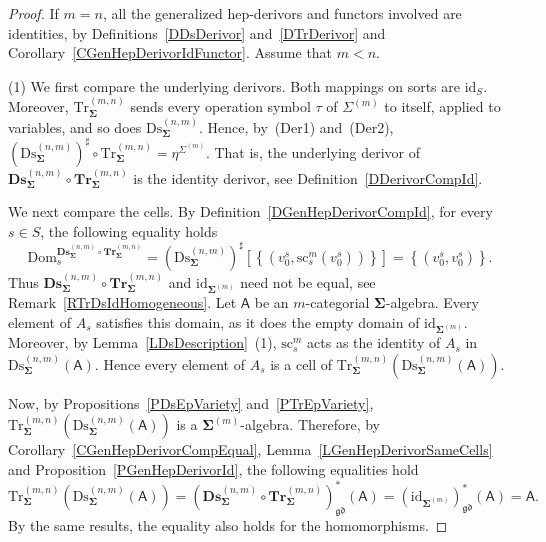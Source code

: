 \documentclass[a4paper, reqno]{amsbook}
\newcommand{\sig}[1]{\mathbf{#1}}             %
\newcommand{\calg}[1]{\boldsymbol{\mathsf{#1}}} %
\newcommand{\Dom}{\mathrm{Dom}}
\newcommand{\gd}{\mathfrak{gd}}              %
\newcommand{\id}{\mathrm{id}}
\newcommand{\src}{\mathrm{sc}}
\newcommand{\Ds}{\mathrm{Ds}}
\newcommand{\Tr}{\mathrm{Tr}}
\newcommand{\bDs}{\mathbf{Ds}}
\newcommand{\bTr}{\mathbf{Tr}}
\theoremstyle{plain}
\theoremstyle{definition}
\begin{document}
\begin{proof}
If $m=n$, all the generalized hep-derivors and functors involved are identities, by Definitions~\ref{DDsDerivor} and~\ref{DTrDerivor} and Corollary~\ref{CGenHepDerivorIdFunctor}.
Assume that $m<n$.

(1) We first compare the underlying derivors.
Both mappings on sorts are $\id_{S}$.
Moreover, $\Tr^{(m,n)}_{\sig{\Sigma}}$ sends every operation symbol $\tau$ of $\Sigma^{(m)}$ to itself, applied to variables, and so does $\Ds^{(n,m)}_{\sig{\Sigma}}$.
Hence, by~(Der1) and~(Der2), $(\Ds^{(n,m)}_{\sig{\Sigma}})^{\sharp}\circ\Tr^{(m,n)}_{\sig{\Sigma}}=\eta^{\Sigma^{(m)}}$.
That is, the underlying derivor of $\bDs^{(n,m)}_{\sig{\Sigma}}\circ\bTr^{(m,n)}_{\sig{\Sigma}}$ is the identity derivor, see Definition~\ref{DDerivorCompId}.

We next compare the cells.
By Definition~\ref{DGenHepDerivorCompId}, for every $s\in S$, the following equality holds
$$
\Dom^{\bDs^{(n,m)}_{\sig{\Sigma}}\circ\bTr^{(m,n)}_{\sig{\Sigma}}}_{s}=\left(\Ds^{(n,m)}_{\sig{\Sigma}}\right)^{\sharp}\left[\left\lbrace\left(v^{s}_{0},\src^{m}_{s}(v^{s}_{0})\right)\right\rbrace\right]=\left\lbrace\left(v^{s}_{0},v^{s}_{0}\right)\right\rbrace.
$$
Thus $\bDs^{(n,m)}_{\sig{\Sigma}}\circ\bTr^{(m,n)}_{\sig{\Sigma}}$ and $\id_{\sig{\Sigma}^{(m)}}$ need not be equal, see Remark~\ref{RTrDsIdHomogeneous}.
Let $\calg{A}$ be an $m$-categorial $\sig{\Sigma}$-algebra.
Every element of $A_{s}$ satisfies this domain, as it does the empty domain of $\id_{\sig{\Sigma}^{(m)}}$.
Moreover, by Lemma~\ref{LDsDescription}~(1), $\src^{m}_{s}$ acts as the identity of $A_{s}$ in $\Ds^{(n,m)}_{\sig{\Sigma}}(\calg{A})$.
Hence every element of $A_{s}$ is a cell of $\Tr^{(m,n)}_{\sig{\Sigma}}(\Ds^{(n,m)}_{\sig{\Sigma}}(\calg{A}))$.

Now, by Propositions~\ref{PDsEpVariety} and~\ref{PTrEpVariety}, $\Tr^{(m,n)}_{\sig{\Sigma}}(\Ds^{(n,m)}_{\sig{\Sigma}}(\calg{A}))$ is a $\sig{\Sigma}^{(m)}$-algebra.
Therefore, by Corollary~\ref{CGenHepDerivorCompEqual}, Lemma~\ref{LGenHepDerivorSameCells} and Proposition~\ref{PGenHepDerivorId}, the following equalities hold
$$
\Tr^{(m,n)}_{\sig{\Sigma}}\left(\Ds^{(n,m)}_{\sig{\Sigma}}(\calg{A})\right)
=
\left(\bDs^{(n,m)}_{\sig{\Sigma}}\circ\bTr^{(m,n)}_{\sig{\Sigma}}\right)^{\ast}_{\gd}(\calg{A})
=
\left(\id_{\sig{\Sigma}^{(m)}}\right)^{\ast}_{\gd}(\calg{A})
=
\calg{A}.
$$
By the same results, the equality also holds for the homomorphisms.


\end{proof}
\end{document}
